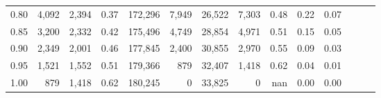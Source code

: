 \begin{tabular}{rrrrrrrrrrrrrr}
0.80 &   4,092 &  2,394 &  0.37 &  172,296 &    7,949 &  26,522 &   7,303 &  0.48 &  0.22 &      0.07 \\
0.85 &   3,200 &  2,332 &  0.42 &  175,496 &    4,749 &  28,854 &   4,971 &  0.51 &  0.15 &      0.05 \\
0.90 &   2,349 &  2,001 &  0.46 &  177,845 &    2,400 &  30,855 &   2,970 &  0.55 &  0.09 &      0.03 \\
0.95 &   1,521 &  1,552 &  0.51 &  179,366 &      879 &  32,407 &   1,418 &  0.62 &  0.04 &      0.01 \\
1.00 &     879 &  1,418 &  0.62 &  180,245 &        0 &  33,825 &       0 &   nan &  0.00 &      0.00 \\
\bottomrule
\end{tabular}
